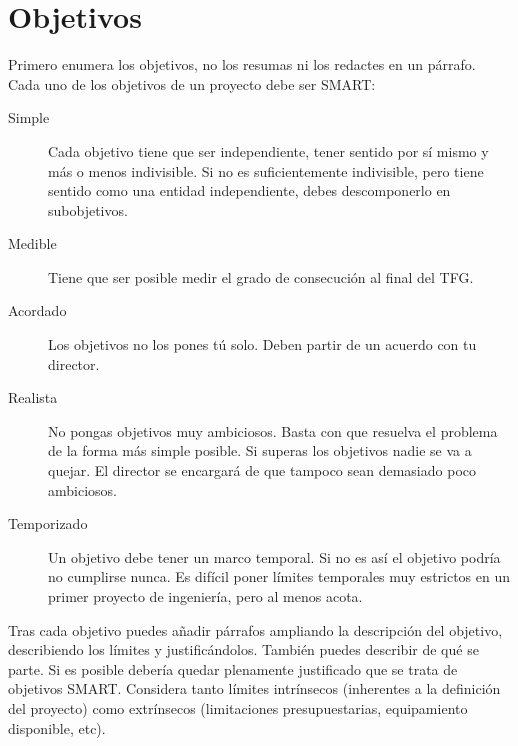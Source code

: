 \chapter{Objetivos}
\label{ch:objetivos}

\avisoLocalizacionArchivo 

Primero enumera los objetivos, no los resumas ni los redactes en un párrafo.  Cada uno de los objetivos de un proyecto debe ser SMART:

\begin{description}
\item[Simple] Cada objetivo tiene que ser independiente, tener sentido por sí mismo y más o menos indivisible.  Si no es suficientemente indivisible, pero tiene sentido como una entidad independiente, debes descomponerlo en subobjetivos.
\item[Medible] Tiene que ser posible medir el grado de consecución al final del TFG.
\item[Acordado] Los objetivos no los pones tú solo.  Deben partir de un acuerdo con tu director.
\item[Realista] No pongas objetivos muy ambiciosos. Basta con que resuelva el problema de la forma más simple posible.  Si superas los objetivos nadie se va a quejar.  El director se encargará de que tampoco sean demasiado poco ambiciosos.
\item[Temporizado] Un objetivo debe tener un marco temporal. Si no es así el objetivo podría no cumplirse nunca.  Es difícil poner límites temporales muy estrictos en un primer proyecto de ingeniería, pero al menos acota.
\end{description}

Tras cada objetivo puedes añadir párrafos ampliando la descripción del objetivo, describiendo los límites y justificándolos.  También puedes describir de qué se parte.  Si es posible debería quedar plenamente justificado que se trata de objetivos SMART.  Considera tanto límites intrínsecos (inherentes a la definición del proyecto) como extrínsecos (limitaciones presupuestarias, equipamiento disponible, etc).